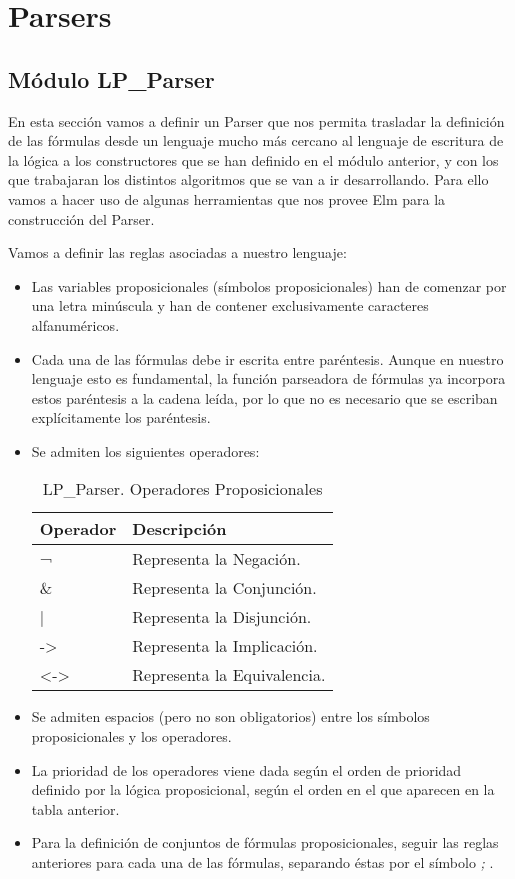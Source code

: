 \documentclass[a4paper]{report}
\begin{document}
\appendix
\clearpage
\addappheadtotoc
\appendixpage
\chapter{Parsers}
\section{Módulo LP\_Parser}
\label{sec:A1.LPParser}

En esta sección vamos a definir un Parser que nos permita trasladar la definición de las fórmulas desde un lenguaje mucho más cercano al lenguaje de escritura de la lógica a los constructores que se han definido en el módulo anterior, y con los que trabajaran los distintos algoritmos que se van a ir desarrollando. Para ello vamos a hacer uso de algunas herramientas que nos provee Elm para la construcción del Parser.

Vamos a definir las reglas asociadas a nuestro lenguaje:

\begin{itemize}
\item Las variables proposicionales (símbolos proposicionales) han de comenzar por una letra minúscula y han de contener exclusivamente caracteres alfanuméricos.

\item Cada una de las fórmulas debe ir escrita entre paréntesis. Aunque en nuestro lenguaje esto es fundamental, la función parseadora de fórmulas ya incorpora estos paréntesis a la cadena leída, por lo que no es necesario que se escriban explícitamente los paréntesis.

\item Se admiten los siguientes operadores:

\begin{table}[H]
\centering
\begin{tabular}{P{3cm} p{5cm}}
\hline
Operador & Descripción\\
\hline
\hline
¬ & Representa la Negación.\\
\hline
\& & Representa la Conjunción.\\
\hline
| & Representa la Disjunción.\\
\hline
-> & Representa la Implicación.\\
\hline
<-> & Representa la Equivalencia.\\
\hline
\end{tabular}
\caption{LP\_Parser. Operadores Proposicionales}
\end{table}

\item Se admiten espacios (pero no son obligatorios) entre los símbolos proposicionales y los operadores.

\item La prioridad de los operadores viene dada según el orden de prioridad definido por la lógica proposicional, según el orden en el que aparecen en la tabla anterior.

\item Para la definición de conjuntos de fórmulas proposicionales, seguir las reglas anteriores para cada una de las fórmulas, separando éstas por el símbolo \textit{;} .
\end{itemize}
\end{document}
